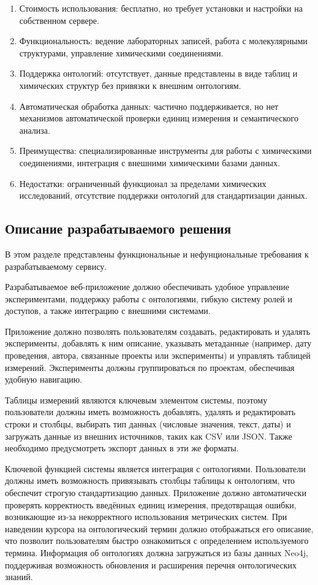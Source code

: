 \begin{enumerate}
    \item Стоимость использования: бесплатно, но требует установки и настройки на собственном сервере.
    \item Функциональность: ведение лабораторных записей, работа с молекулярными структурами, управление химическими соединениями.
    \item Поддержка онтологий: отсутствует, данные представлены в виде таблиц и химических структур без привязки к внешним онтологиям.
    \item Автоматическая обработка данных: частично поддерживается, но нет механизмов автоматической проверки единиц измерения и семантического анализа.
    \item Преимущества: специализированные инструменты для работы с химическими соединениями, интеграция с внешними химическими базами данных.
    \item Недостатки: ограниченный функционал за пределами химических исследований, отсутствие поддержки онтологий для стандартизации данных.
\end{enumerate}

\subsection{Описание разрабатываемого решения}

В этом разделе представлены функциональные и нефунциональные требования к разрабатываемому сервису.

Разрабатываемое веб-приложение должно обеспечивать удобное управление экспериментами, поддержку работы с онтологиями, гибкую систему ролей и доступов, а также интеграцию с внешними системами.

Приложение должно позволять пользователям создавать, редактировать и удалять эксперименты, добавлять к ним описание, указывать метаданные (например, дату проведения, автора, связанные проекты или эксперименты) и управлять таблицей измерений. Эксперименты должны группироваться по проектам, обеспечивая удобную навигацию.

Таблицы измерений являются ключевым элементом системы, поэтому пользователи должны иметь возможность добавлять, удалять и редактировать строки и столбцы, выбирать тип данных (числовые значения, текст, даты) и загружать данные из внешних источников, таких как CSV\cite{Format:CSV} или JSON\cite{Format:JSON}. Также необходимо предусмотреть экспорт данных в эти же форматы.

Ключевой функцией системы является интеграция с онтологиями. Пользователи должны иметь возможность привязывать столбцы таблицы к онтологиям, что обеспечит строгую стандартизацию данных. Приложение должно автоматически проверять корректность введённых единиц измерения, предотвращая ошибки, возникающие из-за некорректного использования метрических систем. При наведении курсора на онтологический термин должно отображаться его описание, что позволит пользователям быстро ознакомиться с определением используемого термина. Информация об онтологиях должна загружаться из базы данных Neo4j\cite{DB:Neo4j}, поддерживая возможность обновления и расширения перечня онтологических знаний.

